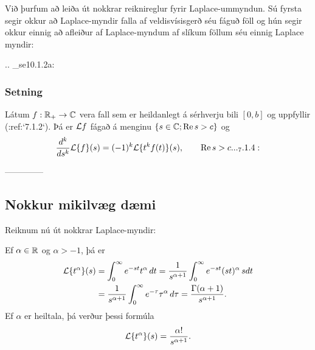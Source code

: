 \smallskip
Við þurfum að leiða út nokkrar reiknireglur fyrir Laplace-ummyndun.
Sú fyrsta segir okkur að Laplace-myndir falla af veldisvísisgerð séu
fáguð föll og hún segir okkur einnig að afleiður af Laplace-myndum 
af slíkum föllum  séu  einnig Laplace myndir: 



.. _se10.1.2a:

\subsubsection{Setning}  Látum $f:{\mathbb R}_+\to {\mathbb C}$ vera fall sem er heildanlegt á
sérhverju bili $[0,b]$ og   uppfyllir (:ref:`7.1.2`).  Þá er ${\cal L} f$ 
fágað á menginu $\{s\in {\mathbb C};{\operatorname{Re\, }} s>c\}$ og 
 \begin{equation*}\dfrac{d^k}{ds^k}\L\{f\}(s)=
(-1)^k\L\{t^kf(t)\}(s), \qquad \Re s>c.


.. _7.1.4:

 \end{equation*}


--------------



\subsection*{Nokkur mikilvæg dæmi}


Reiknum nú út nokkrar Laplace-myndir:


Ef $\alpha\in {\mathbb R}$ og  $\alpha>-1$, þá er
\begin{align*}
{\cal L}\{t^\alpha\}(s)
&=\int_0^\infty e^{-st}t^\alpha \, dt =
\dfrac 1{s^{\alpha+1}} \int_0^\infty e^{-st}(st)^\alpha \, s dt \\
&=
\dfrac 1{s^{\alpha+1}} \int_0^\infty e^{-\tau}\tau^\alpha \,  d\tau =
\dfrac {\Gamma(\alpha+1)}{s^{\alpha+1}}.
\end{align*}
Ef ${\alpha}$ er heiltala, þá verður þessi formúla
$$
{\cal L}\{t^\alpha\}(s)
=\dfrac {\alpha!}{s^{\alpha+1}}.
 $$

